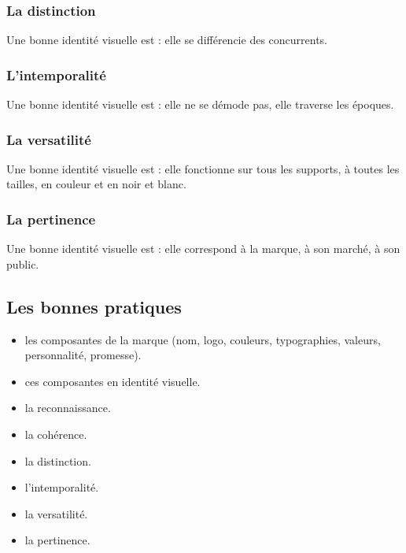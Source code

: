 \subsubsection{La distinction}

Une bonne identité visuelle est  : elle se différencie des concurrents.

\subsubsection{L'intemporalité}

Une bonne identité visuelle est  : elle ne se démode pas, elle traverse les époques.

\subsubsection{La versatilité}

Une bonne identité visuelle est  : elle fonctionne sur tous les supports, à toutes les tailles, en couleur et en noir et blanc.

\subsubsection{La pertinence}

Une bonne identité visuelle est  : elle correspond à la marque, à son marché, à son public.

\subsection{Les bonnes pratiques}

\begin{itemize}
    \item {} les composantes de la marque (nom, logo, couleurs, typographies, valeurs, personnalité, promesse).
    \item {} ces composantes en identité visuelle.
    \item {} la reconnaissance.
    \item {} la cohérence.
    \item {} la distinction.
    \item {} l'intemporalité.
    \item {} la versatilité.
    \item {} la pertinence.
\end{itemize}

